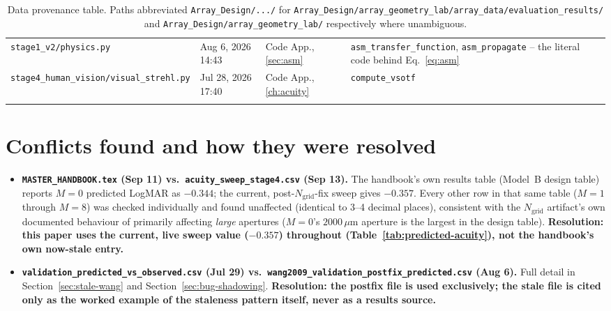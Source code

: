 \begin{longtable}{p{5.8cm}p{2.4cm}p{1.2cm}p{5.4cm}}
\texttt{stage1\_v2/physics.py} & Aug 6, 2026 14:43 & Code App., \ref{sec:asm} & \texttt{asm\_transfer\_function}, \texttt{asm\_propagate} -- the literal code behind Eq.~\ref{eq:asm} \\
\texttt{stage4\_human\_vision/visual\_strehl.py} & Jul 28, 2026 17:40 & Code App., \ref{ch:acuity} & \texttt{compute\_vsotf} \\
\bottomrule
\caption{Data provenance table. Paths abbreviated \texttt{Array\_Design/.../} for
\texttt{Array\_Design/array\_geometry\_lab/array\_data/evaluation\_results/} and
\texttt{Array\_Design/array\_geometry\_lab/} respectively where unambiguous.}
\end{longtable}

\section{Conflicts found and how they were resolved}
\begin{itemize}
\item \textbf{\texttt{MASTER\_HANDBOOK.tex} (Sep 11) vs.\ \texttt{acuity\_sweep\_stage4.csv}
(Sep 13).} The handbook's own results table (Model~B design table) reports $M{=}0$
predicted LogMAR as $-0.344$; the current, post-$N_{\mathrm{grid}}$-fix sweep gives
$-0.357$. Every other row in that same table ($M=1$ through $M=8$) was checked
individually and found unaffected (identical to 3--4 decimal places), consistent with
the $N_{\mathrm{grid}}$ artifact's own documented behaviour of primarily affecting
\emph{large} apertures ($M{=}0$'s $2000\,\mu$m aperture is the largest in the design
table). \textbf{Resolution: this paper uses the current, live sweep value ($-0.357$)
throughout (Table~\ref{tab:predicted-acuity}), not the handbook's own now-stale entry.}
\item \textbf{\texttt{validation\_predicted\_vs\_observed.csv} (Jul 29) vs.\
\texttt{wang2009\_validation\_postfix\_predicted.csv} (Aug 6).} Full detail in
Section~\ref{sec:stale-wang} and Section~\ref{sec:bug-shadowing}. \textbf{Resolution:
the postfix file is used exclusively; the stale file is cited only as the worked
example of the staleness pattern itself, never as a results source.}
\end{itemize}
